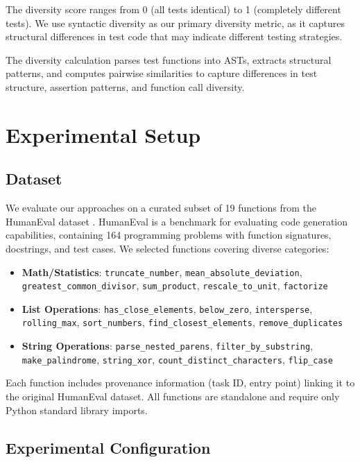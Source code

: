 \documentclass[11pt]{article}
\begin{document}
The diversity score ranges from 0 (all tests identical) to 1 (completely different tests). We use syntactic diversity as our primary diversity metric, as it captures structural differences in test code that may indicate different testing strategies.

The diversity calculation parses test functions into ASTs, extracts structural patterns, and computes pairwise similarities to capture differences in test structure, assertion patterns, and function call diversity.

\section{Experimental Setup}

\subsection{Dataset}

We evaluate our approaches on a curated subset of 19 functions from the HumanEval dataset \cite{Chen2021}. HumanEval is a benchmark for evaluating code generation capabilities, containing 164 programming problems with function signatures, docstrings, and test cases. We selected functions covering diverse categories:

\begin{itemize}
\item \textbf{Math/Statistics}: \texttt{truncate\_number}, \texttt{mean\_absolute\_deviation}, \texttt{greatest\_common\_divisor}, \texttt{sum\_product}, \texttt{rescale\_to\_unit}, \texttt{factorize}
\item \textbf{List Operations}: \texttt{has\_close\_elements}, \texttt{below\_zero}, \texttt{intersperse}, \texttt{rolling\_max}, \texttt{sort\_numbers}, \texttt{find\_closest\_elements}, \texttt{remove\_duplicates}
\item \textbf{String Operations}: \texttt{parse\_nested\_parens}, \texttt{filter\_by\_substring}, \texttt{make\_palindrome}, \texttt{string\_xor}, \texttt{count\_distinct\_characters}, \texttt{flip\_case}
\end{itemize}

Each function includes provenance information (task ID, entry point) linking it to the original HumanEval dataset. All functions are standalone and require only Python standard library imports.

\subsection{Experimental Configuration}
\end{document}

